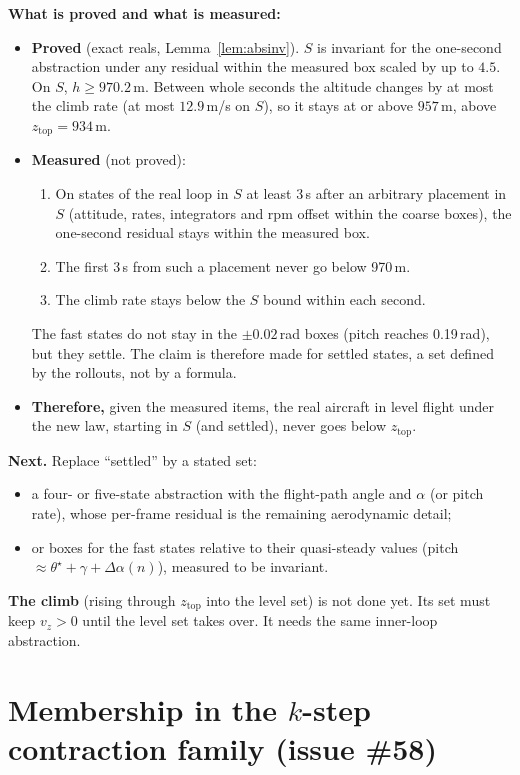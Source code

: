 \documentclass[11pt]{article}
\newcommand{\zTop}{z_{\mathrm{top}}}
\begin{document}
\textbf{What is proved and what is measured:}
\begin{itemize}
\item \textbf{Proved} (exact reals, Lemma~\ref{lem:absinv}). $S$ is invariant for the one-second abstraction under any residual within the measured box scaled by up to $4.5$. On $S$, $h \ge 970.2$\,m. Between whole seconds the altitude changes by at most the climb rate (at most $12.9$\,m/s on $S$), so it stays at or above $957$\,m, above $\zTop = 934$\,m.
\item \textbf{Measured} (not proved):
  \begin{enumerate}
  \item On states of the real loop in $S$ at least 3\,s after an arbitrary placement in $S$ (attitude, rates, integrators and rpm offset within the coarse boxes), the one-second residual stays within the measured box.
  \item The first 3\,s from such a placement never go below 970\,m.
  \item The climb rate stays below the $S$ bound within each second.
  \end{enumerate}
  The fast states do not stay in the $\pm0.02$\,rad boxes (pitch reaches 0.19\,rad), but they settle. The claim is therefore made for settled states, a set defined by the rollouts, not by a formula.
\item \textbf{Therefore,} given the measured items, the real aircraft in level flight under the new law, starting in $S$ (and settled), never goes below $\zTop$.
\end{itemize}

\textbf{Next.} Replace ``settled'' by a stated set:
\begin{itemize}
\item a four- or five-state abstraction with the flight-path angle and $\alpha$ (or pitch rate), whose per-frame residual is the remaining aerodynamic detail;
\item or boxes for the fast states relative to their quasi-steady values (pitch $\approx \theta^\star + \gamma + \Delta\alpha(n)$), measured to be invariant.
\end{itemize}

\textbf{The climb} (rising through $\zTop$ into the level set) is not done yet. Its set must keep $v_z > 0$ until the level set takes over. It needs the same inner-loop abstraction.


\section{Membership in the $k$-step contraction family (issue \#58)}\label{sec:member}
\end{document}
